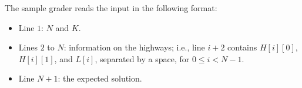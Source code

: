 The sample grader reads the input in the following format:
\begin{itemize}
\item Line $1$: $N$ and $K$.
\item Lines $2$ to $N$: information on the highways; i.e., line $i+2$ contains $H[i][0]$, $H[i][1]$, and $L[i]$, separated by a space, for $0 \le i < N-1$.
\item Line $N+1$: the expected solution. 
\end{itemize}